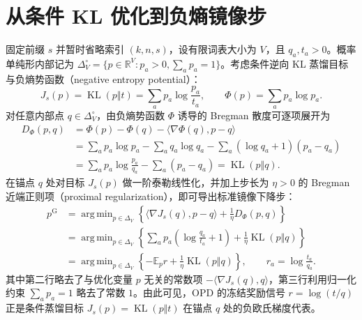 \documentclass[lang=cn,scheme=chinese,openany]{elegantbook}
\newcommand{\E}{\mathbb E}
\newcommand{\KL}{\operatorname{KL}}
\newcommand{\R}{\mathbb R}
\DeclareMathOperator*{\argmin}{arg\,min}
\begin{document}
\section{从条件 KL 优化到负熵镜像步}
\label{sec:foundation-origin}

固定前缀 $s$ 并暂时省略索引 $(k,n,s)$，设有限词表大小为 $V$，且 $q_a,t_a>0$。概率单纯形内部记为 $\Delta_V^\circ=\{p\in\R^V:p_a>0,\sum_a p_a=1\}$。考虑条件逆向 KL 蒸馏目标与负熵势函数（negative entropy potential）：
\begin{equation}
J_s(p)=\KL(p\Vert t)=\sum_a p_a\log\frac{p_a}{t_a},\qquad
\Phi(p)=\sum_a p_a\log p_a.
\end{equation}
对任意内部点 $q\in\Delta_V^\circ$，由负熵势函数 $\Phi$ 诱导的 Bregman 散度可逐项展开为
\begin{align}
D_\Phi(p,q)
&=\Phi(p)-\Phi(q)-\langle\nabla\Phi(q),p-q\rangle\\
&=\sum_a p_a\log p_a-\sum_a q_a\log q_a
-\sum_a(\log q_a+1)(p_a-q_a)\\
&=\sum_a p_a\log\frac{p_a}{q_a}-\sum_a(p_a-q_a)
=\KL(p\Vert q).
\end{align}
在锚点 $q$ 处对目标 $J_s(p)$ 做一阶泰勒线性化，并加上步长为 $\eta>0$ 的 Bregman 近端正则项（proximal regularization），即可导出标准镜像下降步：
\begin{align}
p^{\mathrm G}
&=\argmin_{p\in\Delta_V}\left\{
\langle\nabla J_s(q),p-q\rangle+\frac1\eta D_\Phi(p,q)\right\}\\
&=\argmin_{p\in\Delta_V}\left\{
\sum_a p_a\left(\log\frac{q_a}{t_a}+1\right)
+\frac1\eta\KL(p\Vert q)\right\}\\
&=\argmin_{p\in\Delta_V}\left\{-\E_p r+\frac1\eta\KL(p\Vert q)\right\},
\qquad r_a=\log\frac{t_a}{q_a}.
\label{eq:foundation-md-origin}
\end{align}
其中第二行略去了与优化变量 $p$ 无关的常数项 $-\langle\nabla J_s(q),q\rangle$，第三行利用归一化约束 $\sum_a p_a=1$ 略去了常数 $1$。由此可见，OPD 的冻结奖励信号 $r=\log(t/q)$ 正是条件蒸馏目标 $J_s(p)=\KL(p\Vert t)$ 在锚点 $q$ 处的负欧氏梯度代表。
\end{document}
